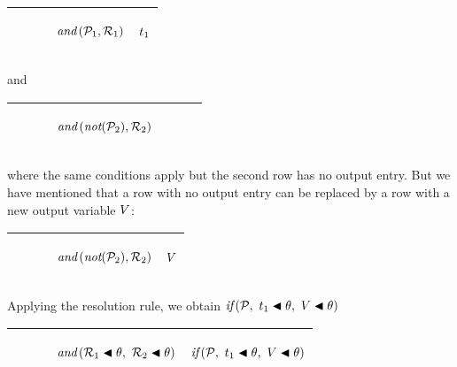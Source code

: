 \documentclass[runningheads]{llncs}
\DeclareMathOperator{\uand}{\emph{and}\,}
\DeclareMathOperator{\unot}{\emph{not}\kern-.0pt}
\begin{document}
   \begin{center}
\begin{tabular} {T}
\hline
    $\qquad$ & \begin{center}$\uand(\expsub{\mathcal{P}}{1},\expsub{\mathcal{R}}{1})$ \end{center}& \begin{center}${t}_{1}$\end{center} \\
  \hline
\end{tabular}
\end{center}
\noindent and
  \begin{center}
\begin{tabular} {T}
\hline
    $\qquad$ & \begin{center}$ \uand(\unot (\expsub{\mathcal{P}}{2}),\expsub{\mathcal{R}}{2})$ \end{center}&  $\qquad$ \\
  \hline
\end{tabular}
\end{center}
\noindent where the same conditions apply but the second row has no output entry.  But we have mentioned that a row with no output entry can be replaced by a row with a new output variable $V$:

  \begin{center}
\begin{tabular} {T}
\hline
    $\qquad$ & \begin{center}$ \uand(\unot (\expsub{\mathcal{P}}{2}),\expsub{\mathcal{R}}{2})$\end{center} & \begin{center} $V $\end{center} \\
  \hline
\end{tabular}
\end{center}

 


\noindent Applying the resolution rule, we obtain
$\emph{if}\,( {\mathcal{P}},\allowbreak \ {{t}_{1} \blacktriangleleft \theta},\allowbreak \ {V \blacktriangleleft \theta})$ 

 \begin{center}
\begin{tabular} {T}
\hline
    $\qquad$ & \begin{center}$\uand(\expsub{\mathcal{R}}{1} \apply \theta, \ \expsub{\mathcal{R}}{2} \apply \theta)$\end{center} &  \begin{center}$\emph{if}\,( {\mathcal{P}},\allowbreak \ {{t}_{1} \blacktriangleleft \theta},\allowbreak \ {V \blacktriangleleft \theta})$\end{center}\\
  \hline
\end{tabular}
\end{center}
\end{document}
